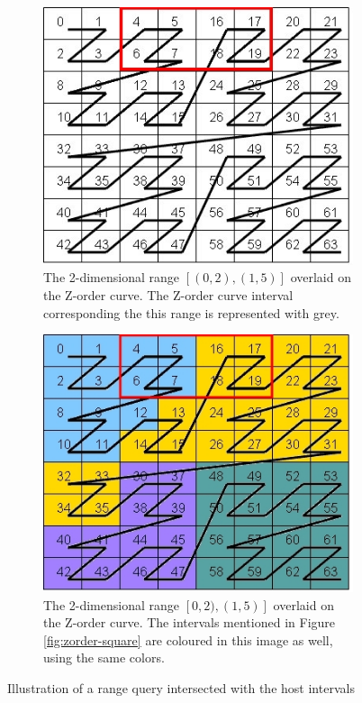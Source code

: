 \documentclass[11pt,a4paper]{globis-book}
\begin{document}
\begin{figure}[t]
    \centering
    \begin{subfigure}[b]{0.4\linewidth}
        \includegraphics[width = \linewidth]{images/zordering-range}
        \caption{The 2-dimensional range $[(0, 2), (1, 5)]$ overlaid on the Z-order curve. The Z-order curve interval corresponding the this range is represented with grey.}
        \label{fig:range-zorder}
    \end{subfigure}%
    \qquad
    \begin{subfigure}[b]{0.4\linewidth}
        \includegraphics[width = \linewidth]{images/zordering-range-intervals}
        \caption{The 2-dimensional range $[{0, 2), (1, 5)}]$ overlaid on the Z-order curve. The intervals mentioned in Figure \ref{fig:zorder-square} are coloured in this image as well, using the same colors.}
        \label{fig:range-zorder-intervals}
    \end{subfigure}
    \caption{Illustration of a range query intersected with the host intervals}
    \label{fig:range}
\end{figure}
\end{document}
